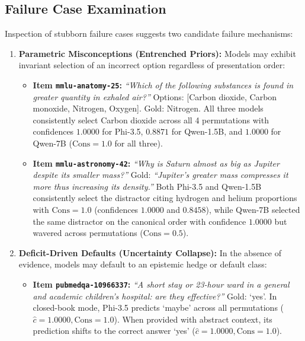\documentclass[sigconf,nonacm]{acmart}
\makeatletter
\DeclareRobustCommand{\_}{\ifmmode\nfss@text{\textunderscore}\else\textunderscore\allowbreak\fi}
\makeatother
\begin{document}
\subsection{Failure Case Examination}
Inspection of stubborn failure cases suggests two candidate failure mechanisms:
\begin{enumerate}
    \item \textbf{Parametric Misconceptions (Entrenched Priors):} Models may exhibit invariant selection of an incorrect option regardless of presentation order:
    \begin{itemize}
        \item \textbf{Item \texttt{mmlu-anatomy-25}:} \textit{``Which of the following substances is found in greater quantity in exhaled air?''} Options: [Carbon dioxide, Carbon monoxide, Nitrogen, Oxygen]. Gold: Nitrogen. All three models consistently select Carbon dioxide across all 4 permutations with confidences $1.0000$ for \textsf{Phi-3.5}, $0.8871$ for \textsf{Qwen-1.5B}, and $1.0000$ for \textsf{Qwen-7B} ($\text{Cons} = 1.0$ for all three).
        \item \textbf{Item \texttt{mmlu-astronomy-42}:} \textit{``Why is Saturn almost as big as Jupiter despite its smaller mass?''} Gold: \textit{``Jupiter's greater mass compresses it more thus increasing its density.''} Both \textsf{Phi-3.5} and \textsf{Qwen-1.5B} consistently select the distractor citing hydrogen and helium proportions with $\text{Cons} = 1.0$ (confidences $1.0000$ and $0.8458$), while \textsf{Qwen-7B} selected the same distractor on the canonical order with confidence $1.0000$ but wavered across permutations ($\text{Cons} = 0.5$).
    \end{itemize}
    \item \textbf{Deficit-Driven Defaults (Uncertainty Collapse):} In the absence of evidence, models may default to an epistemic hedge or default class:
    \begin{itemize}
        \item \textbf{Item \texttt{pubmedqa-10966337}:} \textit{``A short stay or 23-hour ward in a general and academic children's hospital: are they effective?''} Gold: `yes'. In closed-book mode, \textsf{Phi-3.5} predicts `maybe' across all permutations ($\hat{c} = 1.0000, \text{Cons} = 1.0$). When provided with abstract context, its prediction shifts to the correct answer `yes' ($\hat{c} = 1.0000, \text{Cons} = 1.0$).
    \end{itemize}
\end{enumerate}
\end{document}
